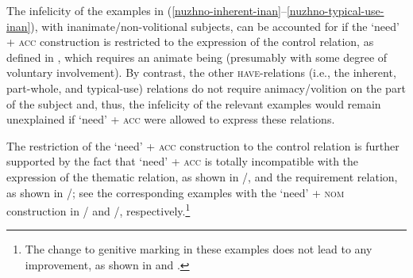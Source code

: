 \documentclass[output=paper]{langscibook}
\begin{document}
\noindent The infelicity of the examples in (\ref{nuzhno-inherent-inan}--\ref{nuzhno-typical-use-inan}), with inanimate/non-volitional subjects, can be accounted for if the `need' + \textsc{acc} construction is restricted to the expression of the control relation, as defined in \citet{Vikner.Jensen2002}, which requires an animate being (presumably with some degree of voluntary involvement). By contrast, the other \textsc{have}-relations (i.e., the inherent, part-whole, and typical-use) relations do not require animacy/volition on the part of the subject and, thus, the infelicity of the relevant examples would remain unexplained if `need' + \textsc{acc} were allowed to express these relations.

The restriction of the `need' + \textsc{acc} construction to the control relation is further supported by the fact that `need' + \textsc{acc} is totally incompatible with the expression of the thematic relation, as shown in /, and the requirement relation, as shown in /; see the corresponding examples with the `need' + \textsc{nom} construction in / and /, respectively.\footnote{The change to genitive marking in these examples does not lead to any improvement, as shown in  and .

\ea
{}
\z\z
}

\ea
{}
\z\z
\end{document}
